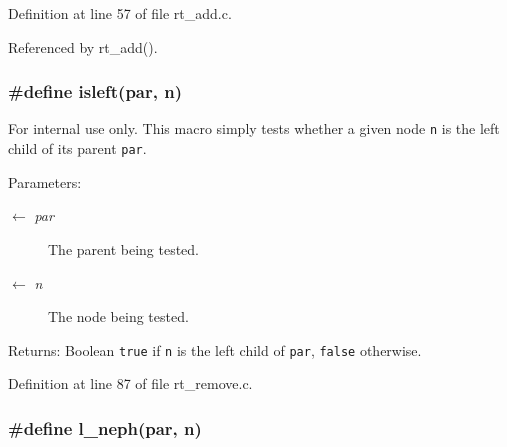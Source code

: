 Definition at line 57 of file rt\_\-add.c.

Referenced by rt\_\-add().\hypertarget{group__dbprim__rbtree_ga48}{
\subsubsection[isleft]{\setlength{\rightskip}{0pt plus 5cm}\#define isleft(par, n)}}
\label{group__dbprim__rbtree_ga48}


\begin{Desc}
\item[For internal use only.]
This macro simply tests whether a given node {\tt n} is the left child of its parent {\tt par}.

\begin{Desc}
\item[Parameters:]
\begin{description}
\item[\mbox{$\leftarrow$} {\em par}]The parent being tested. \item[\mbox{$\leftarrow$} {\em n}]The node being tested.\end{description}
\end{Desc}
\begin{Desc}
\item[Returns:]Boolean {\tt true} if {\tt n} is the left child of {\tt par}, {\tt false} otherwise.\end{Desc}
\end{Desc}


Definition at line 87 of file rt\_\-remove.c.\hypertarget{group__dbprim__rbtree_ga51}{
\subsubsection[l\_\-neph]{\setlength{\rightskip}{0pt plus 5cm}\#define l\_\-neph(par, n)}}
\label{group__dbprim__rbtree_ga51}


